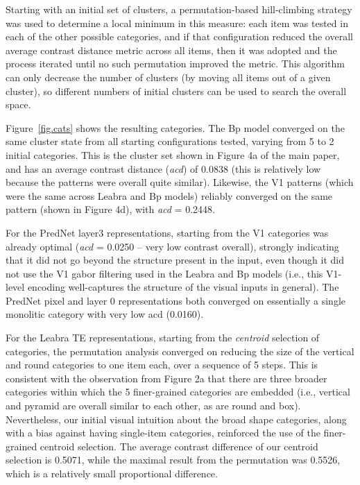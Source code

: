 \documentclass[12pt,twoside]{article}
\newif\myifpdf
\begin{document}
Starting with an initial set of clusters, a permutation-based hill-climbing strategy was used to determine a local minimum in this measure: each item was tested in each of the other possible categories, and if that configuration reduced the overall average contrast distance metric across all items, then it was adopted and the process iterated until no such permutation improved the metric.  This algorithm can only decrease the number of clusters (by moving all items out of a given cluster), so different numbers of initial clusters can be used to search the overall space.

Figure~\ref{fig.cats} shows the resulting categories.  The Bp model converged on the same cluster state from all starting configurations tested, varying from 5 to 2 initial categories.  This is the cluster set shown in Figure 4a of the main paper, and has an average contrast distance ({\em acd}) of 0.0838 (this is relatively low because the patterns were overall quite similar).  Likewise, the V1 patterns (which were the same across Leabra and Bp models) reliably converged on the same pattern (shown in Figure 4d), with {\em acd} = 0.2448.

For the PredNet layer3 representations, starting from the V1 categories was already optimal ({\em acd} = 0.0250 -- very low contrast overall), strongly indicating that it did not go beyond the structure present in the input, even though it did not use the V1 gabor filtering used in the Leabra and Bp models (i.e., this V1-level encoding well-captures the structure of the visual inputs in general).  The PredNet pixel and layer 0 representations both converged on essentially a single monolitic category with very low acd (0.0160).

For the Leabra TE representations, starting from the {\em centroid} selection of categories, the permutation analysis converged on reducing the size of the vertical and round categories to one item each, over a sequence of 5 steps.  This is consistent with the observation from Figure 2a that there are three broader categories within which the 5 finer-grained categories are embedded (i.e., vertical and pyramid are overall similar to each other, as are round and box).  Nevertheless, our initial visual intuition about the broad shape categories, along with a bias against having single-item categories, reinforced the use of the finer-grained centroid selection.  The average contrast difference of our centroid selection is 0.5071, while the maximal result from the permutation was 0.5526, which is a relatively small proportional difference.
\end{document}
